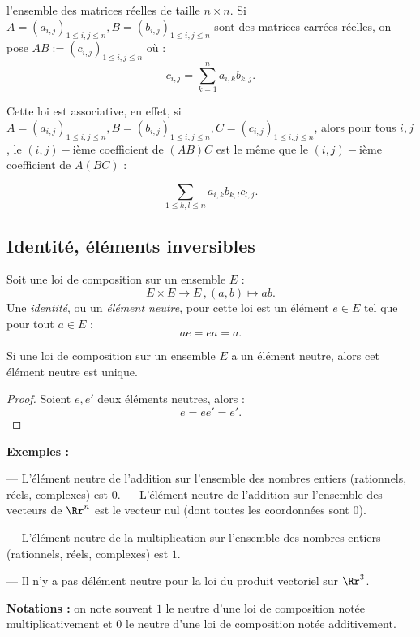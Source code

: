 \documentclass[class=report,crop=false]{standalone}
\begin{document}
l'ensemble des matrices réelles de taille $n \times n$. Si $A=(a_{i,j})_{1 \le i,j \le n} ,B=(b_{i,j})_{1 \le i,j \le n} $ sont des matrices carrées réelles, on pose $AB:=(c_{i,j})_{1 \le i,j \le n}$ où :\[c_{i,j} = \sum_{k=1}^n a_{i,k}b_{k,j} .\]
 
Cette loi est associative, en effet, si $A=(a_{i,j})_{1 \le i,j \le n} ,B=(b_{i,j})_{1 \le i,j \le n} , C= (c_{i,j})_{1 \le i,j \le n}$, alors pour tous $i,j$, le $(i,j)-$ième coefficient de $(AB)C$ est le même que le $(i,j)-$ième coefficient de $A(BC)$ :

\[\sum_{1\le k,l \le n} a_{i,k}b_{k,l}c_{l,j} .\]


\subsection{Identité, éléments inversibles}

\begin{definition}
Soit une loi de composition sur un ensemble $E$ :
\[E \times E \to E\,,(a,b)\mapsto ab .\]
Une {\it identité}, ou un {\it élément neutre}, pour cette loi est un élément $e \in E$ tel que pour tout $a \in E$ :
\[ae=ea=a.\]

\end{definition}

\begin{proposition}
Si une loi de composition sur un ensemble $E$ a un élément neutre, alors cet élément neutre est unique.
\end{proposition}
\begin{proof}
Soient $e,e'$ deux éléments neutres, alors : \[e = ee'= e'.\]
\end{proof}

{\bf Exemples :} 

--- L'élément neutre de l'addition sur l'ensemble des nombres entiers (rationnels, réels, complexes) est $0$. 
--- L'élément neutre de l'addition sur l'ensemble des vecteurs de $\Rr^n$ est le vecteur nul (dont toutes les coordonnées sont $0$). 

--- L'élément neutre de la multiplication sur l'ensemble des nombres entiers (rationnels, réels, complexes) est $1$.


--- Il n'y a pas délément neutre pour la loi du produit vectoriel sur $\Rr^3$.

{\bf Notations :} on note souvent $1$ le neutre d'une loi de composition notée multiplicativement et $0$ le neutre d'une loi de composition notée additivement.
\end{document}
